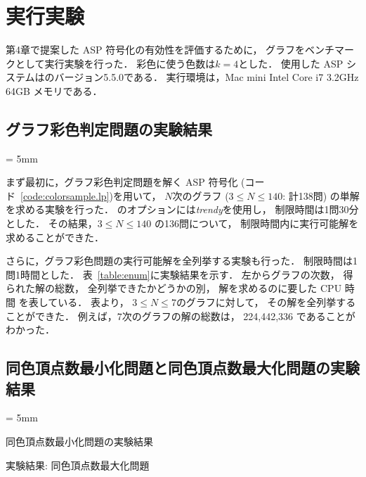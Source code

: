 \chapter{実行実験}\label{chap:experiments}

第4章で提案した ASP 符号化の有効性を評価するために，
グラフをベンチマークとして実行実験を行った．
彩色に使う色数は$k=4$とした．
使用した ASP システムは{\clingo}のバージョン5.5.0である．
実行環境は，Mac mini Intel Core i7 3.2GHz 64GB メモリである．

\section{グラフ彩色判定問題の実験結果}

\begin{table}[ht]
  \centering
  \tabcolsep = 5mm
  \renewcommand{\arraystretch}{1.1}
\end{table}

まず最初に，グラフ彩色判定問題を解く ASP 符号化
(コード~\ref{code:colorsample.lp})を用いて，
$N$次のグラフ ($3 \leq N\leq 140$: 計138問)
の単解を求める実験を行った．
{\clingo}のオプションには\textit{trendy}を使用し，
制限時間は1問30分とした．
その結果，$3 \leq N\leq 140$ の136問について，
制限時間内に実行可能解を求めることができた．

さらに，グラフ彩色問題の実行可能解を全列挙する実験も行った．
制限時間は1問1時間とした．
表~\ref{table:enum}に実験結果を示す．
左からグラフの次数，
得られた解の総数，
全列挙できたかどうかの別，
解を求めるのに要した CPU 時間
を表している．
表より，
$3 \leq N\leq 7$のグラフに対して，
その解を全列挙することができた．
例えば，$7$次のグラフの解の総数は，
224,442,336 であることがわかった．

\section{同色頂点数最小化問題と同色頂点数最大化問題の実験結果}

\begin{table}[htp]
  \tabcolsep = 5mm
  \begin{minipage}[t]{0.45\linewidth}
    \centering
    \caption{同色頂点数最小化問題の実験結果}
    \label{table:min}
  \end{minipage}
  \begin{minipage}[t]{0.45\linewidth}
    \centering
    \caption{実験結果: 同色頂点数最大化問題}
    \label{table:max}
  \end{minipage}
\end{table}

